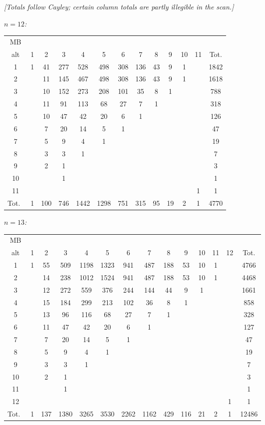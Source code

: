 \documentclass[11pt,a4paper]{article}
\begin{document}
\noindent\textit{[Totals follow Cayley; certain column totals are partly illegible in the scan.]}

\noindent\textit{$n=12$:}
\begin{center}
\begin{tabular}{c|ccccccccccc|c}
MB \\ alt & 1 & 2 & 3 & 4 & 5 & 6 & 7 & 8 & 9 & 10 & 11 & Tot.\\\hline
1 & 1 & 41 & 277 & 528 & 498 & 308 & 136 & 43 & 9 & 1 & & 1842\\
2 & & 11 & 145 & 467 & 498 & 308 & 136 & 43 & 9 & 1 & & 1618\\
3 & & 10 & 152 & 273 & 208 & 101 & 35 & 8 & 1 & & & 788\\
4 & & 11 & 91 & 113 & 68 & 27 & 7 & 1 & & & & 318\\
5 & & 10 & 47 & 42 & 20 & 6 & 1 & & & & & 126\\
6 & & 7 & 20 & 14 & 5 & 1 & & & & & & 47\\
7 & & 5 & 9 & 4 & 1 & & & & & & & 19\\
8 & & 3 & 3 & 1 & & & & & & & & 7\\
9 & & 2 & 1 & & & & & & & & & 3\\
10 & & & 1 & & & & & & & & & 1\\
11 & & & & & & & & & & & 1 & 1\\\hline
Tot.\ & 1 & 100 & 746 & 1442 & 1298 & 751 & 315 & 95 & 19 & 2 & 1 & 4770
\end{tabular}
\end{center}

\noindent\textit{$n=13$:}
\begin{center}
\begin{tabular}{c|cccccccccccc|c}
MB \\ alt & 1 & 2 & 3 & 4 & 5 & 6 & 7 & 8 & 9 & 10 & 11 & 12 & Tot.\\\hline
1 & 1 & 55 & 509 & 1198 & 1323 & 941 & 487 & 188 & 53 & 10 & 1 & & 4766\\
2 & & 14 & 238 & 1012 & 1524 & 941 & 487 & 188 & 53 & 10 & 1 & & 4468\\
3 & & 12 & 272 & 559 & 376 & 244 & 144 & 44 & 9 & 1 & & & 1661\\
4 & & 15 & 184 & 299 & 213 & 102 & 36 & 8 & 1 & & & & 858\\
5 & & 13 & 96 & 116 & 68 & 27 & 7 & 1 & & & & & 328\\
6 & & 11 & 47 & 42 & 20 & 6 & 1 & & & & & & 127\\
7 & & 7 & 20 & 14 & 5 & 1 & & & & & & & 47\\
8 & & 5 & 9 & 4 & 1 & & & & & & & & 19\\
9 & & 3 & 3 & 1 & & & & & & & & & 7\\
10 & & 2 & 1 & & & & & & & & & & 3\\
11 & & & 1 & & & & & & & & & & 1\\
12 & & & & & & & & & & & & 1 & 1\\\hline
Tot.\ & 1 & 137 & 1380 & 3265 & 3530 & 2262 & 1162 & 429 & 116 & 21 & 2 & 1 & 12486
\end{tabular}
\end{center}
\end{document}
